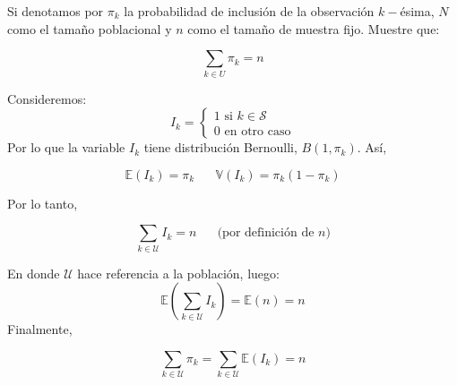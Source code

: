 \addpoints

\question [10] Si denotamos por $\pi_k$ la probabilidad de inclusión de la observación $k-$ésima, $N$ como el tamaño poblacional y $n$ como el tamaño de muestra fijo. Muestre que:

$$\sum_{k\in U} \pi_k=n$$

\begin{solution}
Consideremos:
$$I_k=\begin{cases}
1 \text{ si } k\in \mathcal{S}\\
0 \text{ en otro caso}
\end{cases}$$
Por lo que la variable $I_k$ tiene distribución Bernoulli, $B(1,\pi_k)$. Así,

$$\mathbb{E}(I_k)=\pi_k \hspace{20pt} \mathbb{V}(I_k)=\pi_k(1-\pi_k)$$

Por lo tanto,

$$\sum_{k\in\mathcal{U}} I_k=n \hspace{20pt}\text{(por definición de }n\text{)}$$

En donde $\mathcal{U}$ hace referencia a la población, luego:
$$\mathbb{E}\left(\sum_{k\in\mathcal{U}}I_k\right)=\mathbb{E}(n)=n$$
Finalmente,

$$\sum_{k\in\mathcal{U}}\pi_k=\sum_{k\in\mathcal{U}}\mathbb{E}(I_k)=n$$
\end{solution}

